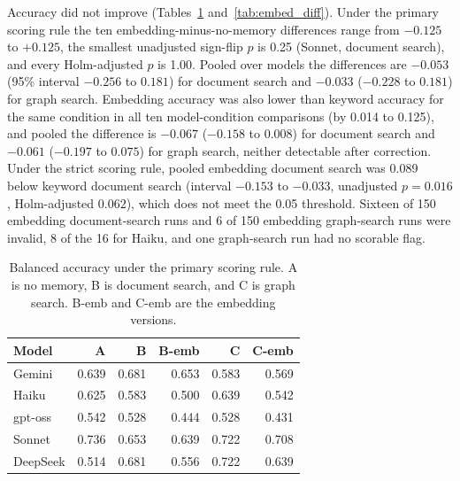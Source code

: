 \documentclass[11pt]{article}
\begin{document}
Accuracy did not improve (Tables~\ref{tab:embed_acc} and~\ref{tab:embed_diff}). Under the primary scoring rule the ten embedding-minus-no-memory differences range from $-0.125$ to $+0.125$, the smallest unadjusted sign-flip $p$ is 0.25 (Sonnet, document search), and every Holm-adjusted $p$ is 1.00. Pooled over models the differences are $-0.053$ (95\% interval $-0.256$ to $0.181$) for document search and $-0.033$ ($-0.228$ to $0.181$) for graph search. Embedding accuracy was also lower than keyword accuracy for the same condition in all ten model-condition comparisons (by 0.014 to 0.125), and pooled the difference is $-0.067$ ($-0.158$ to $0.008$) for document search and $-0.061$ ($-0.197$ to $0.075$) for graph search, neither detectable after correction. Under the strict scoring rule, pooled embedding document search was 0.089 below keyword document search (interval $-0.153$ to $-0.033$, unadjusted $p = 0.016$, Holm-adjusted $0.062$), which does not meet the 0.05 threshold. Sixteen of 150 embedding document-search runs and 6 of 150 embedding graph-search runs were invalid, 8 of the 16 for Haiku, and one graph-search run had no scorable flag.

\begin{table}[ht]
\centering
\caption{Balanced accuracy under the primary scoring rule. A is no memory, B is document search, and C is graph search. B-emb and C-emb are the embedding versions.}
\label{tab:embed_acc}
\small
\begin{tabular}{lrrrrr}
\toprule
Model & A & B & B-emb & C & C-emb \\
\midrule
Gemini & 0.639 & 0.681 & 0.653 & 0.583 & 0.569 \\
Haiku & 0.625 & 0.583 & 0.500 & 0.639 & 0.542 \\
gpt-oss & 0.542 & 0.528 & 0.444 & 0.528 & 0.431 \\
Sonnet & 0.736 & 0.653 & 0.639 & 0.722 & 0.708 \\
DeepSeek & 0.514 & 0.681 & 0.556 & 0.722 & 0.639 \\
\bottomrule
\end{tabular}
\end{table}
\end{document}
